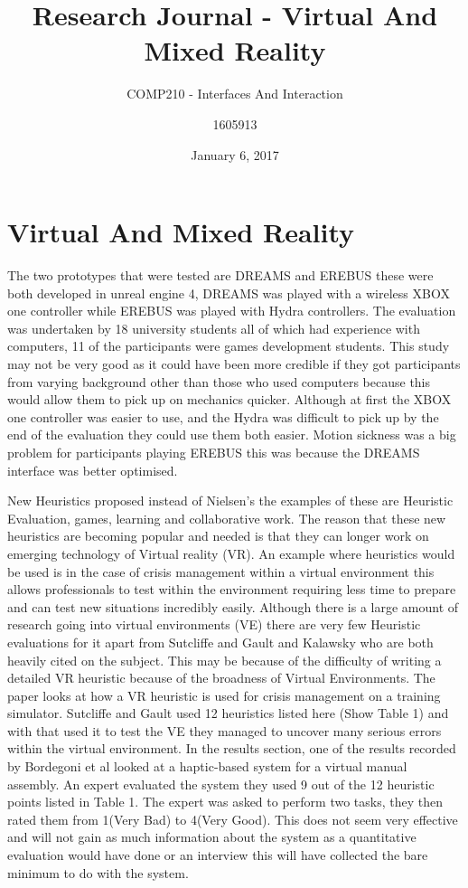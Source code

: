 \documentclass[11pt]{scrartcl}
\title{Research Journal - Virtual And Mixed Reality}
\date{January 6, 2017}
\subtitle{COMP210 - Interfaces And Interaction}
\author{1605913}
\begin{document}
\maketitle

\section{Virtual And Mixed Reality}

The two prototypes that were tested are DREAMS and EREBUS these were both developed in unreal engine 4, DREAMS was played with a wireless XBOX one controller while EREBUS was played with Hydra controllers. The evaluation was undertaken by 18 university students all of which had experience with computers, 11 of the participants were games development students. This study may not be very good as it could have been more credible if they got participants from varying background other than those who used computers because this would allow them to pick up on mechanics quicker. Although at first the XBOX one controller was easier to use, and the Hydra was difficult to pick up by the end of the evaluation they could use them both easier. Motion sickness was a big problem for participants playing EREBUS this was because the DREAMS interface was better optimised.\cite{mentzelopoulos2015hardware}

New Heuristics proposed instead of Nielsen’s the examples of these are Heuristic Evaluation, games, learning and collaborative work. The reason that these new heuristics are becoming popular and needed is that they can longer work on emerging technology of Virtual reality (VR). An example where heuristics would be used is in the case of crisis management within a virtual environment this allows professionals to test within the environment requiring less time to prepare and can test new situations incredibly easily. Although there is a large amount of research going into virtual environments (VE) there are very few Heuristic evaluations for it apart from Sutcliffe and Gault\cite{sutcliffe2004heuristic} and Kalawsky\cite{kalawsky1999vruse} who are both heavily cited on the subject. This may be because of the difficulty of writing a detailed VR heuristic because of the broadness of Virtual Environments.
The paper looks at how a VR heuristic is used for crisis management on a training simulator. Sutcliffe and Gault\cite{sutcliffe2004heuristic} used 12 heuristics listed here (Show Table 1) and with that used it to test the VE they managed to uncover many serious errors within the virtual environment.
In the results section, one of the results recorded by Bordegoni et a\cite{bordegoni2009evaluation}l looked at a haptic-based system for a virtual manual assembly. An expert evaluated the system they used 9 out of the 12 heuristic points listed in Table 1. The expert was asked to perform two tasks, they then rated them from 1(Very Bad) to 4(Very Good). This does not seem very effective and will not gain as much information about the system as a quantitative evaluation would have done or an interview this will have collected the bare minimum to do with the system.\cite{hvannberg2012exploitation}
\end{document}
